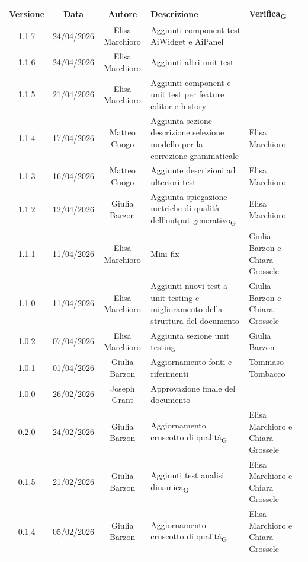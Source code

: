 \documentclass[11pt,a4paper]{article}
\newcommand{\gls}[1]{#1\textsubscript{G}}
\begin{document}
\begin{table}[H]
    \centering
    \begin{tabular}{|c|c|c|>{\raggedright\arraybackslash}p{}|p{}|}
        \hline
        \textbf{Versione} & \textbf{Data} & \textbf{Autore} & \textbf{Descrizione} & \textbf{\gls{Verifica}} \\
        \hline
        1.1.7 & 24/04/2026 & Elisa Marchioro & Aggiunti component test AiWidget e AiPanel & \\
        \hline
        1.1.6 & 24/04/2026 & Elisa Marchioro & Aggiunti altri unit test & \\
        \hline
        1.1.5 & 21/04/2026 & Elisa Marchioro & Aggiunti component e unit test per feature editor e history & \\
        \hline
        1.1.4 & 17/04/2026 & Matteo Cuogo & Aggiunta sezione descrizione selezione modello per la correzione grammaticale & Elisa Marchioro\\
        \hline
        1.1.3 & 16/04/2026 & Matteo Cuogo & Aggiunte descrizioni ad ulteriori test & Elisa Marchioro\\
        \hline
        1.1.2 & 12/04/2026 & Giulia Barzon & Aggiunta spiegazione metriche di \gls{qualità dell'output generativo} & Elisa Marchioro\\
        \hline
        1.1.1 & 11/04/2026 & Elisa Marchioro & Mini fix & Giulia Barzon e Chiara Grossele\\
        \hline
        1.1.0 & 11/04/2026 & Elisa Marchioro & Aggiunti nuovi test a unit testing e miglioramento della struttura del documento & Giulia Barzon e Chiara Grossele\\
        \hline
        1.0.2 & 07/04/2026 & Elisa Marchioro & Aggiunta sezione unit testing & Giulia Barzon\\
        \hline
        1.0.1 & 01/04/2026 & Giulia Barzon & Aggiornamento fonti e riferimenti & Tommaso Tombacco \\
        \hline
        1.0.0 & 26/02/2026 & Joseph Grant & Approvazione finale del documento &  \\
        \hline
        0.2.0 & 24/02/2026 & Giulia Barzon & Aggiornamento \gls{cruscotto di qualità} & Elisa Marchioro e Chiara Grossele\\
        \hline
        0.1.5 & 21/02/2026 & Giulia Barzon & Aggiunti test \gls{analisi dinamica} & Elisa Marchioro e Chiara Grossele\\
        \hline
        0.1.4 & 05/02/2026 & Giulia Barzon & Aggiornamento \gls{cruscotto di qualità} & Elisa Marchioro e Chiara Grossele\\

\end{tabular}
\end{table}
\end{document}
